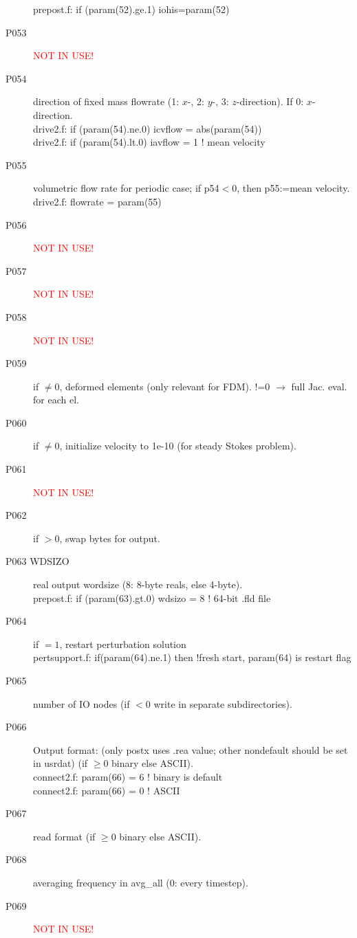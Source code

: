 \begin{description}
prepost.f:      if (param(52).ge.1) iohis=param(52)
\item [P053  ] {\textcolor{red}{ NOT IN USE!}}
\item [P054  ] direction of fixed mass flowrate (1: \(x\)-, 2: \(y\)-, 3: \(z\)-direction). If 0: \(x\)-direction.\\
drive2.f:      if (param(54).ne.0) icvflow = abs(param(54))\\
drive2.f:      if (param(54).lt.0) iavflow = 1 ! mean velocity
\item [P055  ] volumetric flow rate for periodic case;  if p54\(<0\), then p55:=mean velocity.\\
drive2.f:      flowrate = param(55)
\item [P056  ] {\textcolor{red}{ NOT IN USE!}}
\item [P057  ] {\textcolor{red}{ NOT IN USE!}}
\item [P058  ] {\textcolor{red}{ NOT IN USE!}}
\item [P059  ] if \(\neq0\), deformed elements (only relevant for FDM). !=0 \(\rightarrow\) full Jac. eval. for each el.
\item [P060  ] if \(\neq0\), initialize velocity to 1e-10 (for steady Stokes problem).
\item [P061  ] {\textcolor{red}{ NOT IN USE!}}
\item [P062  ] if \(>0\), swap bytes for output.
\item [P063  WDSIZO] real output wordsize (8: 8-byte reals, else 4-byte).\\
prepost.f:      if (param(63).gt.0) wdsizo = 8         ! 64-bit .fld file
\item [P064  ] if \(=1\), restart perturbation solution\\
pertsupport.f:      if(param(64).ne.1) then !fresh start, param(64) is restart flag
\item [P065  ] number of I\/O nodes (if \(< 0\) write in separate subdirectories).
\item [P066  ] Output format: (only postx uses .rea value; other nondefault should be set in usrdat) (if \(\geq 0\) binary else ASCII).\\
connect2.f:         param(66) = 6        ! binary is default\\
connect2.f:         param(66) = 0        ! ASCII
\item [P067  ] read format (if \(\geq 0\) binary else ASCII).
\item [P068  ] averaging frequency in avg\_all (0: every timestep).
\item [P069  ] {\textcolor{red}{ NOT IN USE!}}

\end{description}
